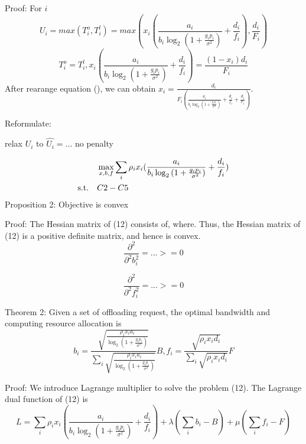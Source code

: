 \documentclass{article}
\begin{document}
Proof:
For $i$
\begin{equation}
U_{i}=max(T_{i}^{o}, T_{i}^{l})=max(x_{i}(\frac{a_{i}}{b_{i}\log_{2}{ (1+\frac{g_{i}p_{i}}{ \sigma^{2} } )}} + \frac{d_{i}}{f_{i}}), \frac{d_{i}}{F_{i}})
\end{equation}
\begin{equation}
T_{i}^{o}=T_{i}^{l}, x_{i}(\frac{ a_{i} }{ b_{i}\log_{2}{ (1+\frac{g_{i}p_{i}}{ \sigma^{2} } )} } + \frac{d_{i}}{f_{i}})= \frac{ (1-x_{i})d_{i} }{F_{i}}
\end{equation}
After rearange equation (), we can obtain $x_{i}=\frac{d_{i}}{ F_{i}(\frac{a_{i}}{b_{i}\log_{2}{ (1+\frac{g_{i}p_{i}}{ \sigma^{2} } )}} + \frac{d_{i}}{f_{i}}+\frac{d_{i}}{F_{i}}) }$.

Reformulate:

relax $U_{i}$ to $\hat{U_{i}}=...$ no penalty

\begin{align}\
& \max_{x,b,f} \sum_{i}\rho_{i}x_{i}(\frac{a_{i}}{b_{i}\log_{2}{ (1+\frac{g_{i}p_{i}}{ \sigma^{2} } )} }+\frac{d_{i}}{f_{i}})  \nonumber\\
\rm{s.t.} \quad &C2-C5 \nonumber\\
\end{align}
Proposition 2:
Objective is convex

Proof:
The Hessian matrix of (12) consists of, where. Thus, the Hessian matrix of (12) is a positive definite matrix, and hence is convex.
\begin{equation}
\frac{\partial^{2}}{\partial^{2}b^{2}_{i}}= ... >=0
\end{equation}

\begin{equation}
\frac{\partial^{2}}{\partial^{2}f^{2}_{i}}= ... >=0
\end{equation}

Theorem 2:
Given a set of offloading request, the optimal bandwidth and computing resource allocation is
\begin{equation}
b_{i}=\frac{\sqrt{\frac{\rho_{i}x_{i}a_{i}}{\log_{2}{ (1+\frac{g_{i}p_{i}}{ \sigma^{2} } )} }}}{\sum_{i}\sqrt{\frac{\rho_{i}x_{i}a_{i}}{\log_{2}{ (1+\frac{g_{i}p_{i}}{ \sigma^{2} } )} }}}B, f_{i}=\frac{ \sqrt{ \rho_{i}x_{i}d_{i}} } { \sum_{i}\sqrt{\rho_{i}x_{i}d_{i}} }F
\end{equation}

Proof:
We introduce Lagrange multiplier to solve the problem (12). The Lagrange dual function of (12) is
\begin{equation}
L=\sum_{i}\rho_{i}x_{i}(\frac{a_{i}}{b_{i}\log_{2}{ (1+\frac{g_{i}p_{i}}{ \sigma^{2} } )} }+\frac{d_{i}}{f_{i}}) + \lambda(\sum_{i}b_{i}-B) + \mu(\sum_{i}f_{i}-F)
\end{equation}
\end{document}
